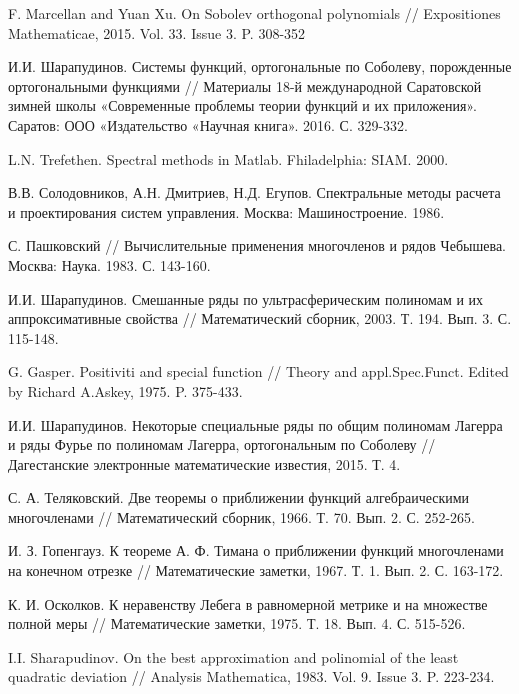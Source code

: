 \begin{thebibliography}{999}

F. Marcellan and Yuan Xu. On Sobolev orthogonal polynomials // Expositiones Mathematicae, 2015. Vol. 33. Issue 3. P. 308-352

 И.И. Шарапудинов. Системы функций, ортогональные по Соболеву, порожденные ортогональными функциями // Материалы 18-й международной Саратовской зимней школы «Современные проблемы теории функций и их приложения». Саратов: ООО «Издательство «Научная книга». 2016. С. 329-332.

 L.N. Trefethen. Spectral methods in Matlab. Fhiladelphia: SIAM. 2000.

 В.В. Солодовников, А.Н. Дмитриев, Н.Д. Егупов. Спектральные методы расчета и проектирования систем управления. Москва: Машиностроение. 1986.

 С. Пашковский // Вычислительные применения многочленов и рядов Чебышева. Москва: Наука. 1983. С. 143-160.

 И.И. Шарапудинов. Смешанные ряды по ультрасферическим полиномам и их аппроксимативные свойства // Математический сборник, 2003. Т. 194. Вып. 3. С. 115-148.

 G. Gasper. Positiviti and special function // Theory and appl.Spec.Funct. Edited by Richard A.Askey, 1975. P. 375-433.

 И.И. Шарапудинов. Некоторые специальные ряды по общим полиномам Лагерра и ряды Фурье по полиномам Лагерра, ортогональным по Соболеву // Дагестанские электронные математические известия, 2015. Т. 4.

 С. А. Теляковский. Две теоремы о приближении функций алгебраическими многочленами // Математический сборник, 1966. Т. 70. Вып. 2. С. 252-265.

 И. З. Гопенгауз. К теореме А. Ф. Тимана о приближении функций многочленами на конечном отрезке // Математические  заметки, 1967. Т. 1. Вып. 2. С. 163-172.

 К. И. Осколков. К неравенству Лебега в равномерной метрике и на множестве полной меры // Математические  заметки, 1975. Т. 18. Вып. 4. С. 515-526.

 I.I. Sharapudinov. On the best approximation and polinomial of the least quadratic deviation // Analysis Mathematica, 1983. Vol. 9. Issue 3. P. 223-234.


\end{thebibliography}
